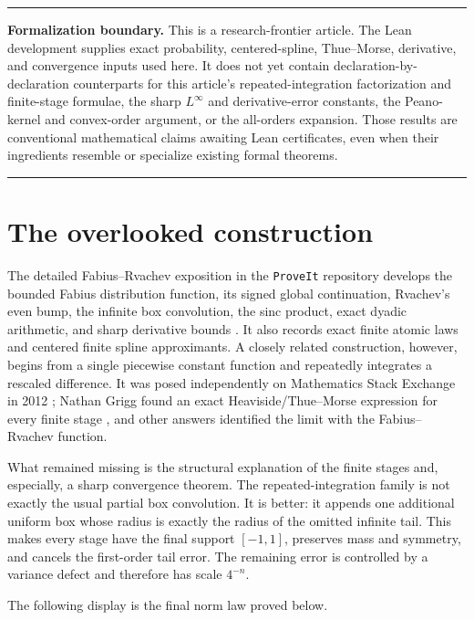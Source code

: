 \documentclass[11pt,oneside]{article}
\theoremstyle{definition}
\theoremstyle{remark}
\newenvironment{boxedremark}{%
  \par\smallskip\noindent\begin{center}\begin{minipage}{0.94\textwidth}%
  \color{black}\hrule\vspace{0.6em}\small
}{%
  \vspace{0.6em}\hrule\end{minipage}\end{center}\smallskip
}
\begin{document}
\begin{boxedremark}
\textbf{Formalization boundary.}
This is a research-frontier article.  The Lean development supplies exact
probability, centered-spline, Thue--Morse, derivative, and convergence inputs
used here.  It does not yet contain declaration-by-declaration counterparts for
this article's repeated-integration factorization and finite-stage formulae,
the sharp $L^\infty$ and derivative-error constants, the Peano-kernel and
convex-order argument, or the all-orders expansion.  Those results are
conventional mathematical claims awaiting Lean certificates, even when their
ingredients resemble or specialize existing formal theorems.
\end{boxedremark}

\tableofcontents
\newpage

\section{The overlooked construction}
\label{sec:introduction}

The detailed Fabius--Rvachev exposition in the \texttt{ProveIt} repository develops the
bounded Fabius distribution function, its signed global continuation, Rvachev's even bump,
the infinite box convolution, the sinc product, exact dyadic arithmetic, and sharp derivative
bounds \cite{companion,proveit}.  It also records exact finite atomic laws and centered finite
spline approximants.  A closely related construction, however, begins from a
single piecewise constant function and repeatedly integrates a rescaled difference.  It was
posed independently on Mathematics Stack Exchange in 2012 \cite{msequestion}; Nathan Grigg
found an exact Heaviside/Thue--Morse expression for every finite stage \cite{mseanswer}, and
other answers identified the limit with the Fabius--Rvachev function.

What remained missing is the structural explanation of the finite stages and, especially, a
sharp convergence theorem.  The repeated-integration family is not exactly the usual partial
box convolution.  It is better: it appends one additional uniform box whose radius is exactly
the radius of the omitted infinite tail.  This makes every stage have the final support
$[-1,1]$, preserves mass and symmetry, and cancels the first-order tail error.  The remaining
error is controlled by a variance defect and therefore has scale $4^{-n}$.

The following display is the final norm law proved below.
\end{document}
